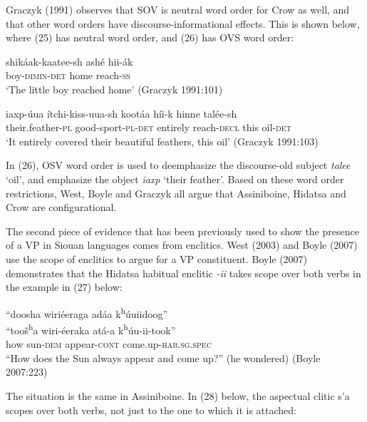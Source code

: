 \documentclass[output=paper]{LSP/langsci}
\begin{document}
Graczyk (1991) observes that SOV is neutral word order for Crow as well, and that other word orders have discourse-informational effects.  This is shown below, where (25) has neutral word order, and (26) has OVS word order:

\begin{exe}
\ex \gll shik\'aak-kaatee-sh ash\'e 		hii-\'ak \\
boy-\textsc{dimin-det} 		home 	reach-\textsc{ss} \\
\trans `The little boy reached home' (Graczyk 1991:101)

\ex \gll iaxp-\'uua 		\'itchi-kiss-uua-sh			koot\'aa 	h\'ii-k 	hinne		tal\'ee-sh \\
their.feather-\textsc{pl} good-sport-\textsc{pl}-\textsc{det}		entirely 	reach-\textsc{decl}	this 	oil-\textsc{det} \\
\trans `It entirely covered their beautiful feathers, this oil' (Graczyk 1991:103)
\end{exe}

In (26), OSV word order is used to deemphasize the discourse-old subject \textit{talee} `oil', and emphasize the object \textit{iaxp} `their feather'.  Based on these word order restrictions, West, Boyle and Graczyk all argue that Assiniboine, Hidatsa and Crow are configurational. 
	
The second piece of evidence that has been previously used to show the presence of a VP in Siouan languages comes from enclitics. West (2003) and Boyle (2007) use the scope of enclitics to argue for a VP constituent. Boyle (2007) demonstrates that the Hidatsa habitual enclitic \textit{-ii} takes scope over both verbs in the example in (27) below:

\begin{exe}
\ex 
\glll ``doosha	wiri\'eeraga 	ad\'aa 	 k\textsuperscript{h}\'uuiidoog''\\
``too\v{s}\textsuperscript{h}a 	wiri-\'eeraka 	at\'a-a k\textsuperscript{h}\'uu-ii-took'' \\
how 	sun-\textsc{dem} 	appear-\textsc{cont}  come.up-\textsc{hab.sg.spec} \\
\trans ``How does the Sun always appear and come up?'' (he wondered) (Boyle 2007:223)
\end{exe}

The situation is the same in Assiniboine.  In (28) below, the aspectual clitic s'a scopes over both verbs, not just to the one to which it is attached:
\end{document}
